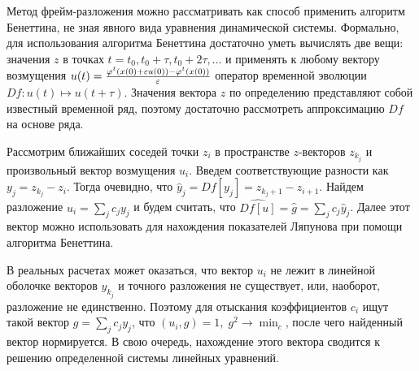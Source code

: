 Метод фрейм-разложения можно рассматривать как способ применить алгоритм Бенеттина, не зная явного вида уравнения динамической системы.
Формально, для использования алгоритма Бенеттина достаточно уметь вычислять две вещи: значения $z$ в точках $t = t_0, t_0+\tau, t_0+2\tau, \dots$ и применять к любому вектору возмущения $u(t) = \frac{\varphi^t\left( x(0)+\varepsilon u(0) \right) - \varphi^t\left( x(0) \right)}{\varepsilon}$ оператор временной эволюции $Df: u(t) \mapsto u(t+\tau)$.
Значения вектора $z$ по определению представляют собой известный временной ряд, поэтому достаточно рассмотреть аппроксимацию $Df$ на основе ряда.

Рассмотрим ближайших соседей точки $z_i$ в пространстве $z$-векторов $z_{k_j}$ и произвольный вектор возмущения $u_i$.
Введем соответствующие разности как $y_j = z_{k_j} - z_i$.
Тогда очевидно, что $\hat{y}_j = Df [y_j] = z_{k_j+1} - z_{i+1}$.
Найдем разложение $u_i = \sum_{j} c_j y_j$ и будем считать, что $\widehat{Df[u]} = \hat{g} = \sum_j c_j \hat{y}_j$.
Далее этот вектор можно использовать для нахождения показателей Ляпунова при помощи алгоритма Бенеттина.

В реальных расчетах может оказаться, что вектор $u_i$ не лежит в линейной оболочке векторов $y_{k_j}$ и точного разложения не существует, или, наоборот, разложение не единственно.
Поэтому для отыскания коэффициентов $c_i$ ищут такой вектор $g = \sum_{j} c_j y_j$, что $\left( u_i, g \right) = 1,\; g^2 \to \min_{c}$, после чего найденный вектор нормируется.
В свою очередь, нахождение этого вектора сводится к решению определенной системы линейных уравнений.
